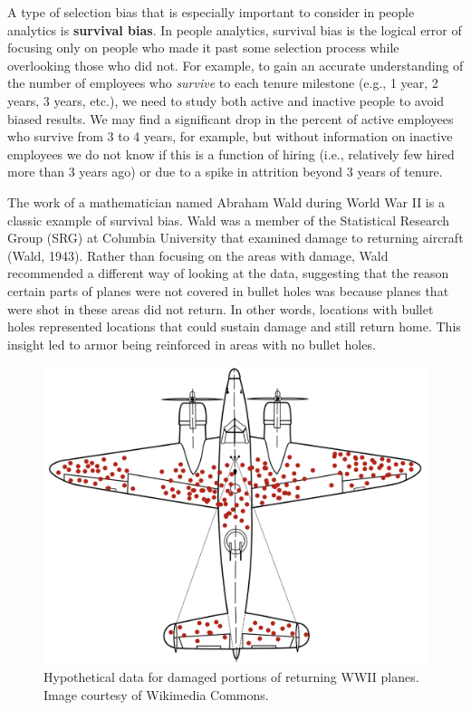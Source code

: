 \documentclass[
]{book}
\begin{document}
A type of selection bias that is especially important to consider in people analytics is \textbf{survival bias}. In people analytics, survival bias is the logical error of focusing only on people who made it past some selection process while overlooking those who did not. For example, to gain an accurate understanding of the number of employees who \emph{survive} to each tenure milestone (e.g., 1 year, 2 years, 3 years, etc.), we need to study both active and inactive people to avoid biased results. We may find a significant drop in the percent of active employees who survive from 3 to 4 years, for example, but without information on inactive employees we do not know if this is a function of hiring (i.e., relatively few hired more than 3 years ago) or due to a spike in attrition beyond 3 years of tenure.

The work of a mathematician named Abraham Wald during World War II is a classic example of survival bias. Wald was a member of the Statistical Research Group (SRG) at Columbia University that examined damage to returning aircraft (Wald, 1943). Rather than focusing on the areas with damage, Wald recommended a different way of looking at the data, suggesting that the reason certain parts of planes were not covered in bullet holes was because planes that were shot in these areas did not return. In other words, locations with bullet holes represented locations that could sustain damage and still return home. This insight led to armor being reinforced in areas with no bullet holes.

\begin{figure}

{\centering \includegraphics[width=0.75\linewidth]{graphics/ww2_plane_damage} 

}

\caption{Hypothetical data for damaged portions of returning WWII planes. Image courtesy of Wikimedia Commons.}\label{fig:ww2-plane-damage}
\end{figure}
\end{document}

